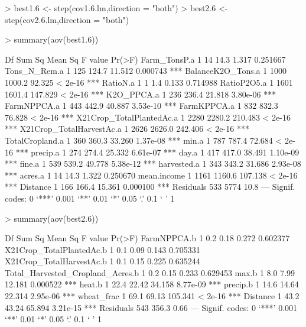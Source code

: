 \documentclass{report}
\begin{document}
\begin{Schunk}
\begin{Sinput}
> best1.6 <- step(cov1.6.lm,direction = "both")
> best2.6 <- step(cov2.6.lm,direction = "both")
\end{Sinput}
\end{Schunk}
\begin{Schunk}
\begin{Sinput}
> summary(aov(best1.6))
\end{Sinput}
\begin{Soutput}
                          Df Sum Sq Mean Sq F value   Pr(>F)    
Farm_TonsP.a               1     14    14.3   1.317 0.251667    
Tons_N_Rem.a               1    125   124.7  11.512 0.000743 ***
BalanceK2O_Tons.a          1   1000  1000.2  92.325  < 2e-16 ***
RatioN.a                   1      1     1.4   0.133 0.714988    
RatioP2O5.a                1   1601  1601.4 147.829  < 2e-16 ***
K2O_PPCA.a                 1    236   236.4  21.818 3.80e-06 ***
FarmNPPCA.a                1    443   442.9  40.887 3.53e-10 ***
FarmKPPCA.a                1    832   832.3  76.828  < 2e-16 ***
X21Crop_TotalPlantedAc.a   1   2280  2280.2 210.483  < 2e-16 ***
X21Crop_TotalHarvestAc.a   1   2626  2626.0 242.406  < 2e-16 ***
TotalCropland.a            1    360   360.3  33.260 1.37e-08 ***
min.a                      1    787   787.4  72.684  < 2e-16 ***
precip.a                   1    274   274.4  25.332 6.61e-07 ***
day.a                      1    417   417.0  38.491 1.10e-09 ***
fine.a                     1    539   539.2  49.778 5.38e-12 ***
harvested.a                1    343   343.2  31.686 2.93e-08 ***
acres.a                    1     14    14.3   1.322 0.250670    
mean.income                1   1161  1160.6 107.138  < 2e-16 ***
Distance                   1    166   166.4  15.361 0.000100 ***
Residuals                533   5774    10.8                     
---
Signif. codes:  0 ‘***’ 0.001 ‘**’ 0.01 ‘*’ 0.05 ‘.’ 0.1 ‘ ’ 1
\end{Soutput}
\begin{Sinput}
> summary(aov(best2.6))
\end{Sinput}
\begin{Soutput}
                                  Df Sum Sq Mean Sq F value   Pr(>F)    
FarmNPPCA.b                        1    0.2    0.18   0.272 0.602377    
X21Crop_TotalPlantedAc.b           1    0.1    0.09   0.143 0.705331    
X21Crop_TotalHarvestAc.b           1    0.1    0.15   0.225 0.635244    
Total_Harvested_Cropland_Acres.b   1    0.2    0.15   0.233 0.629453    
max.b                              1    8.0    7.99  12.181 0.000522 ***
heat.b                             1   22.4   22.42  34.158 8.77e-09 ***
precip.b                           1   14.6   14.64  22.314 2.95e-06 ***
wheat_frac                         1   69.1   69.13 105.341  < 2e-16 ***
Distance                           1   43.2   43.24  65.894 3.21e-15 ***
Residuals                        543  356.3    0.66                     
---
Signif. codes:  0 ‘***’ 0.001 ‘**’ 0.01 ‘*’ 0.05 ‘.’ 0.1 ‘ ’ 1
\end{Soutput}
\end{Schunk}
\end{document}
